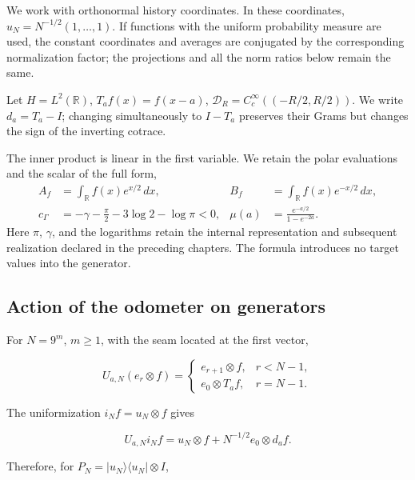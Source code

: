 We work with orthonormal history coordinates. In these coordinates, \(u_N=N^{-1/2}(1,\ldots,1)\). If functions with the uniform probability measure are used, the constant coordinates and averages are conjugated by the corresponding normalization factor; the projections and all the norm ratios below remain the same.

Let \(H=L^2(\mathbb R)\), \(T_af(x)=f(x-a)\), \(\mathcal D_R=C_c^\infty((-R/2,R/2))\). We write \(d_a=T_a-I\); changing simultaneously to \(I-T_a\) preserves their Grams but changes the sign of the inverting cotrace.

The inner product is linear in the first variable. We retain the
polar evaluations and the scalar of the full form,
\begin{equation}
\begin{aligned}
A_f&=\int_{\mathbb R}f(x)e^{x/2}\,dx,
&B_f&=\int_{\mathbb R}f(x)e^{-x/2}\,dx,\\
c_\Gamma&=-\gamma-\frac\pi2-3\log2-\log\pi<0,
&\mu(a)&=\frac{e^{-a/2}}{1-e^{-2a}}.
\end{aligned}
\label{gamma-add-def-evaluaciones}
\end{equation}
Here \(\pi\), \(\gamma\), and the logarithms retain the internal
representation and subsequent realization declared in the preceding chapters.
The formula introduces no target values into the generator.

\subsection{Action of the odometer on generators}
\label{gamma-add-sub-47}

For \(N=9^m\), \(m\ge1\), with the seam located at the first vector,

\begin{equation}
U_{a,N}(e_r\otimes f)=
\begin{cases}
e_{r+1}\otimes f,&r<N-1,\\
e_0\otimes T_af,&r=N-1.
\end{cases}
\label{gamma-add-display-1}
\end{equation}

The uniformization \(i_Nf=u_N\otimes f\) gives

\begin{equation}
U_{a,N}i_Nf
=u_N\otimes f+N^{-1/2}e_0\otimes d_af.
\label{gamma-add-display-2}
\end{equation}

Therefore, for \(P_N=|u_N\rangle\langle u_N|\otimes I\),

